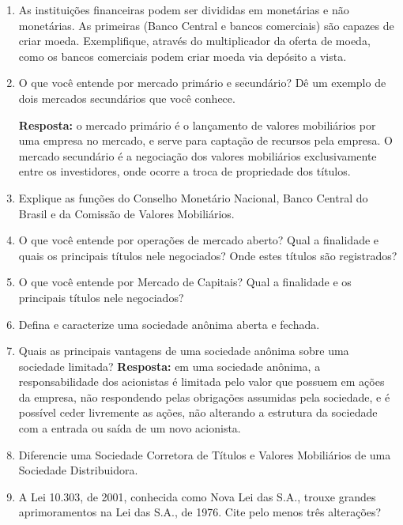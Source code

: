 \documentclass{article}
\begin{document}
\begin{enumerate}
    \item As instituições financeiras podem ser divididas em monetárias e não
        monetárias. As primeiras (Banco Central e bancos comerciais) são
        capazes de criar moeda. Exemplifique, através do multiplicador da
        oferta de moeda, como os bancos comerciais podem criar moeda via
        depósito a vista.

    \item O que você entende por mercado primário e secundário? Dê um exemplo
        de dois mercados secundários que você conhece.

        \textbf{Resposta:} o mercado primário é o lançamento de valores
        mobiliários por uma empresa no mercado, e serve para captação de
        recursos pela empresa. O mercado secundário é a negociação dos valores
        mobiliários exclusivamente entre os investidores, onde ocorre a troca
        de propriedade dos títulos.

    \item Explique as funções do Conselho Monetário Nacional, Banco Central do
        Brasil e da Comissão de Valores Mobiliários.

    \item O que você entende por operações de mercado aberto? Qual a finalidade
        e quais os principais títulos nele negociados? Onde estes títulos são
        registrados?

    \item O que você entende por Mercado de Capitais? Qual a finalidade e os
        principais títulos nele negociados?

    \item Defina e caracterize uma sociedade anônima aberta e fechada.

    \item Quais as principais vantagens de uma sociedade anônima sobre uma
        sociedade limitada?
        \textbf{Resposta:} em uma sociedade anônima, a responsabilidade dos
        acionistas é limitada pelo valor que possuem em ações da empresa, não
        respondendo pelas obrigações assumidas pela sociedade, e é possível
        ceder livremente as ações, não alterando a estrutura da sociedade com a
        entrada ou saída de um novo acionista.

    \item Diferencie uma Sociedade Corretora de Títulos e Valores Mobiliários
        de uma Sociedade Distribuidora.

    \item A Lei 10.303, de 2001, conhecida como Nova Lei das S.A., trouxe
        grandes aprimoramentos na Lei das S.A., de 1976. Cite pelo menos três
        alterações?


\end{enumerate}
\end{document}
